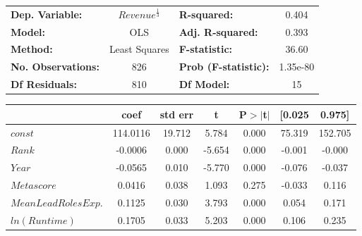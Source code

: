         \begin{table}[H]
            \begin{center}
                \begin{tabular}{lclc}
                    \toprule
                    \textbf{Dep. Variable:}           &  $Revenue^{\frac{1}{3}}$   & \textbf{  R-squared:         } &     0.404   \\
                    \textbf{Model:}                   &       OLS        & \textbf{  Adj. R-squared:    } &     0.393   \\
                    \textbf{Method:}                  &  Least Squares   & \textbf{  F-statistic:       } &     36.60   \\
                    \textbf{No. Observations:}        &         826      & \textbf{  Prob (F-statistic):} &  1.35e-80   \\
                    \textbf{Df Residuals:}            &         810      & \textbf{Df Model:}             &       15  \\
                    \bottomrule
                \end{tabular}
                \begin{tabular}{lcccccc}
                                                    & \textbf{coef} & \textbf{std err} & \textbf{t} & \textbf{P$> |$t$|$} & \textbf{[0.025} & \textbf{0.975]}  \\
                    \midrule
                    \textbf{$const$}                &     114.0116  &       19.712     &     5.784  &         0.000        &       75.319    &      152.705     \\
                    \textbf{$Rank$}                 &      -0.0006  &        0.000     &    -5.654  &         0.000        &       -0.001    &       -0.000     \\
                    \textbf{$Year$}                 &      -0.0565  &        0.010     &    -5.770  &         0.000        &       -0.076    &       -0.037     \\
                    \textbf{$Metascore$}            &       0.0416  &        0.038     &     1.093  &         0.275        &       -0.033    &        0.116     \\
                    \textbf{$Mean Lead Roles Exp.$} &       0.1125  &        0.030     &     3.793  &         0.000        &        0.054    &        0.171     \\
                    \textbf{$ln(Runtime)$}          &       0.1705  &        0.033     &     5.203  &         0.000        &        0.106    &        0.235     \\

\end{tabular}
\end{center}
\end{table}
